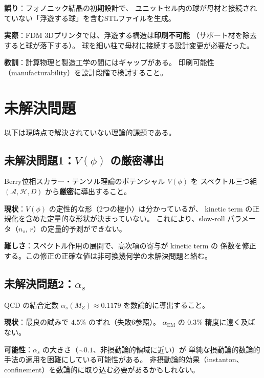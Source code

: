 \begin{warningbox}[失敗8: 印刷不可能な設計]
\textbf{誤り}：フォノニック結晶の初期設計で、
ユニットセル内の球が母材と接続されていない「浮遊する球」を含むSTLファイルを生成。

\medskip
\textbf{実際}：FDM 3Dプリンタでは、浮遊する構造は\textbf{印刷不可能}
（サポート材を除去すると球が落下する）。
球を細い柱で母材に接続する設計変更が必要だった。

\medskip
\textbf{教訓}：計算物理と製造工学の間にはギャップがある。
印刷可能性（manufacturability）を設計段階で検討すること。
\end{warningbox}

\section{未解決問題}
\label{sec:18.2}

以下は現時点で解決されていない理論的課題である。

\subsection{未解決問題1：$V(\phi)$ の厳密導出}

\begin{dfnbox}
Berry位相スカラー・テンソル理論のポテンシャル $V(\phi)$ を
スペクトル三つ組 $(\mathcal{A}, \mathcal{H}, D)$ から\textbf{厳密に}導出すること。

\medskip
\textbf{現状}：$V(\phi)$ の定性的な形（2つの極小）は分かっているが、
kinetic term の正規化を含めた定量的な形状が決まっていない。
これにより、slow-roll パラメータ（$n_s$, $r$）の定量的予測ができない。

\medskip
\textbf{難しさ}：スペクトル作用の展開で、高次項の寄与が kinetic term の
係数を修正する。この修正の正確な値は非可換幾何学の未解決問題と絡む。
\end{dfnbox}

\subsection{未解決問題2：$\alpha_s$}

\begin{dfnbox}
QCD の結合定数 $\alpha_s(M_Z) \approx 0.1179$ を数論的に導出すること。

\medskip
\textbf{現状}：最良の試みで $4.5\%$ のずれ（失敗6参照）。
$\alpha_{\mathrm{EM}}$ の $0.3\%$ 精度に遠く及ばない。

\medskip
\textbf{可能性}：$\alpha_s$ の大きさ（$\sim 0.1$、非摂動論的領域に近い）が
単純な摂動論的数論的手法の適用を困難にしている可能性がある。
非摂動論的効果（instanton、confinement）を数論的に取り込む必要があるかもしれない。
\end{dfnbox}

